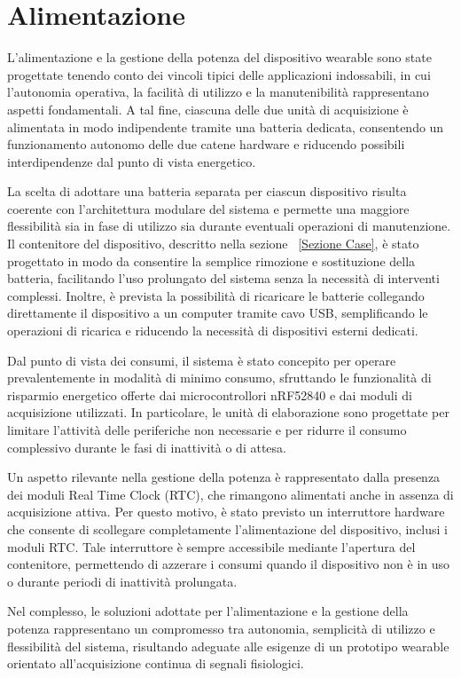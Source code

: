 \documentclass[11pt,a4paper]{article}
\begin{document}
\section{Alimentazione}
L’alimentazione e la gestione della potenza del dispositivo wearable sono state progettate tenendo conto dei vincoli tipici delle applicazioni indossabili, in cui l’autonomia operativa, la facilità di utilizzo e la manutenibilità rappresentano aspetti fondamentali.
A tal fine, ciascuna delle due unità di acquisizione è alimentata in modo indipendente tramite una batteria dedicata, consentendo un funzionamento autonomo delle due catene hardware e riducendo possibili interdipendenze dal punto di vista energetico.

La scelta di adottare una batteria separata per ciascun dispositivo risulta coerente con l’architettura modulare del sistema e permette una maggiore flessibilità sia in fase di utilizzo sia durante eventuali operazioni di manutenzione. Il contenitore del dispositivo, descritto nella sezione ~\ref{Sezione Case}, è stato progettato in modo da consentire la semplice rimozione e sostituzione della batteria, facilitando l’uso prolungato del sistema senza la necessità di interventi complessi. Inoltre, è prevista la possibilità di ricaricare le batterie collegando direttamente il dispositivo a un computer tramite cavo USB, semplificando le operazioni di ricarica e riducendo la necessità di dispositivi esterni dedicati.

Dal punto di vista dei consumi, il sistema è stato concepito per operare prevalentemente in modalità di minimo consumo, sfruttando le funzionalità di risparmio energetico offerte dai microcontrollori nRF52840 e dai moduli di acquisizione utilizzati. In particolare, le unità di elaborazione sono progettate per limitare l’attività delle periferiche non necessarie e per ridurre il consumo complessivo durante le fasi di inattività o di attesa.

Un aspetto rilevante nella gestione della potenza è rappresentato dalla presenza dei moduli Real Time Clock (RTC), che rimangono alimentati anche in assenza di acquisizione attiva. Per questo motivo, è stato previsto un interruttore hardware che consente di scollegare completamente l’alimentazione del dispositivo, inclusi i moduli RTC. Tale interruttore è sempre accessibile mediante l’apertura del contenitore, permettendo di azzerare i consumi quando il dispositivo non è in uso o durante periodi di inattività prolungata.

Nel complesso, le soluzioni adottate per l’alimentazione e la gestione della potenza rappresentano un compromesso tra autonomia, semplicità di utilizzo e flessibilità del sistema, risultando adeguate alle esigenze di un prototipo wearable orientato all’acquisizione continua di segnali fisiologici.
\end{document}

